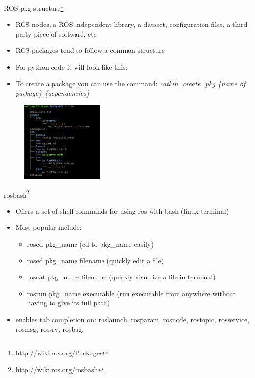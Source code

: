 \documentclass{beamer}
\begin{document}
\begin{frame}{ROS pkg structure\footnote{\url{http://wiki.ros.org/Packages}}}
	
	\begin{itemize}
		\item ROS nodes, a ROS-independent library, a dataset, configuration files, a third-party piece of software, etc
		\item ROS packages tend to follow a common structure
		\item For python code it will look like this:
		\item To create a package you can use the command: \newline 
		\textit{catkin\_create\_pkg \{name of package\} \{dependencies\}}
	\end{itemize}
	
	\begin{figure}[H]
		\centering
		\includegraphics[height=4.0cm]{images/ros_pkg_structure.png}
	\end{figure}
	
\end{frame}


\begin{frame}{rosbash\footnote{\url{http://wiki.ros.org/rosbash}}}
		
	\begin{itemize}
		\item Offers a set of shell commands for using ros with bash (linux terminal)
		\item Most popular include:
		\begin{itemize}
			\item roscd pkg\_name (cd to pkg\_name easily)
			\item rosed pkg\_name filename (quickly edit a file)
			\item roscat pkg\_name filename (quickly visualize a file in terminal)
			\item rosrun pkg\_name executable (run executable from anywhere without having to give its full path)
		\end{itemize}
		\item enables tab completion on: roslaunch, rosparam, rosnode, rostopic, rosservice, rosmsg, rossrv, rosbag. 
	\end{itemize}

\end{frame}
\end{document}
